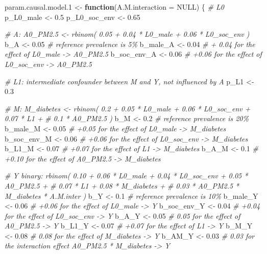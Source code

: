 \documentclass[
]{book}
\newenvironment{Shaded}{\begin{snugshade}}{\end{snugshade}}
\newcommand{\AttributeTok}[1]{\textcolor[rgb]{0.13,0.29,0.53}{#1}}
\newcommand{\CommentTok}[1]{\textcolor[rgb]{0.56,0.35,0.01}{\textit{#1}}}
\newcommand{\ConstantTok}[1]{\textcolor[rgb]{0.56,0.35,0.01}{#1}}
\newcommand{\ControlFlowTok}[1]{\textcolor[rgb]{0.13,0.29,0.53}{\textbf{#1}}}
\newcommand{\FloatTok}[1]{\textcolor[rgb]{0.00,0.00,0.81}{#1}}
\newcommand{\NormalTok}[1]{#1}
\newcommand{\OtherTok}[1]{\textcolor[rgb]{0.56,0.35,0.01}{#1}}
\begin{document}
\begin{Shaded}
\begin{Highlighting}[]
\NormalTok{param.causal.model}\FloatTok{.1} \OtherTok{\textless{}{-}} \ControlFlowTok{function}\NormalTok{(}\AttributeTok{A.M.interaction =} \ConstantTok{NULL}\NormalTok{) \{}
\CommentTok{\# L0}
\NormalTok{p\_L0\_male }\OtherTok{\textless{}{-}} \FloatTok{0.5}
\NormalTok{p\_L0\_soc\_env }\OtherTok{\textless{}{-}} \FloatTok{0.65}

\CommentTok{\# A: A0\_PM2.5 \textless{}{-} rbinom( 0.05 + 0.04 * L0\_male + 0.06 * L0\_soc\_env ) }
\NormalTok{b\_A }\OtherTok{\textless{}{-}} \FloatTok{0.05}   \CommentTok{\# reference prevalence is 5\%}
\NormalTok{b\_male\_A }\OtherTok{\textless{}{-}} \FloatTok{0.04}  \CommentTok{\# + 0.04 for the effect of L0\_male {-}\textgreater{} A0\_PM2.5}
\NormalTok{b\_soc\_env\_A }\OtherTok{\textless{}{-}} \FloatTok{0.06}  \CommentTok{\# +0.06 for the effect of L0\_soc\_env {-}\textgreater{} A0\_PM2.5}

\CommentTok{\# L1: intermediate confounder between M and Y, not influenced by A}
\NormalTok{p\_L1 }\OtherTok{\textless{}{-}} \FloatTok{0.3}

\CommentTok{\# M: M\_diabetes \textless{}{-} rbinom( 0.2 + 0.05 * L0\_male + 0.06 * L0\_soc\_env + 0.07 * L1 +}
\CommentTok{\#                         0.1 * A0\_PM2.5 ) }
\NormalTok{b\_M }\OtherTok{\textless{}{-}} \FloatTok{0.2} \CommentTok{\# reference prevalence is 20\%}
\NormalTok{b\_male\_M }\OtherTok{\textless{}{-}} \FloatTok{0.05} \CommentTok{\# +0.05 for the effect of L0\_male {-}\textgreater{} M\_diabetes}
\NormalTok{b\_soc\_env\_M }\OtherTok{\textless{}{-}} \FloatTok{0.06} \CommentTok{\# +0.06 for the effect of L0\_soc\_env {-}\textgreater{} M\_diabetes}
\NormalTok{b\_L1\_M }\OtherTok{\textless{}{-}} \FloatTok{0.07} \CommentTok{\# +0.07 for the effect of L1 {-}\textgreater{} M\_diabetes}
\NormalTok{b\_A\_M }\OtherTok{\textless{}{-}} \FloatTok{0.1} \CommentTok{\# +0.10 for the effect of A0\_PM2.5 {-}\textgreater{} M\_diabetes}

\CommentTok{\# Y binary: rbinom( 0.10 + 0.06 * L0\_male + 0.04 * L0\_soc\_env + 0.05 * A0\_PM2.5 +}
\CommentTok{\#                   0.07 * L1 + 0.08 * M\_diabetes +}
\CommentTok{\#                   0.03 * A0\_PM2.5 * M\_diabetes * A.M.inter ) }
\NormalTok{b\_Y }\OtherTok{\textless{}{-}} \FloatTok{0.1} \CommentTok{\# reference prevalence is 10\%}
\NormalTok{b\_male\_Y }\OtherTok{\textless{}{-}} \FloatTok{0.06} \CommentTok{\# +0.06 for the effect of L0\_male {-}\textgreater{} Y}
\NormalTok{b\_soc\_env\_Y }\OtherTok{\textless{}{-}} \FloatTok{0.04} \CommentTok{\# +0.04 for the effect of L0\_soc\_env {-}\textgreater{} Y}
\NormalTok{b\_A\_Y }\OtherTok{\textless{}{-}} \FloatTok{0.05} \CommentTok{\# 0.05 for the effect of A0\_PM2.5 {-}\textgreater{} Y}
\NormalTok{b\_L1\_Y }\OtherTok{\textless{}{-}} \FloatTok{0.07} \CommentTok{\# +0.07 for the effect of L1 {-}\textgreater{} Y}
\NormalTok{b\_M\_Y }\OtherTok{\textless{}{-}} \FloatTok{0.08} \CommentTok{\# 0.08 for the effect of M\_diabetes {-}\textgreater{} Y}
\NormalTok{b\_AM\_Y }\OtherTok{\textless{}{-}} \FloatTok{0.03} \CommentTok{\# 0.03 for the interaction effect A0\_PM2.5 * M\_diabetes {-}\textgreater{} Y}


\end{Highlighting}
\end{Shaded}
\end{document}
